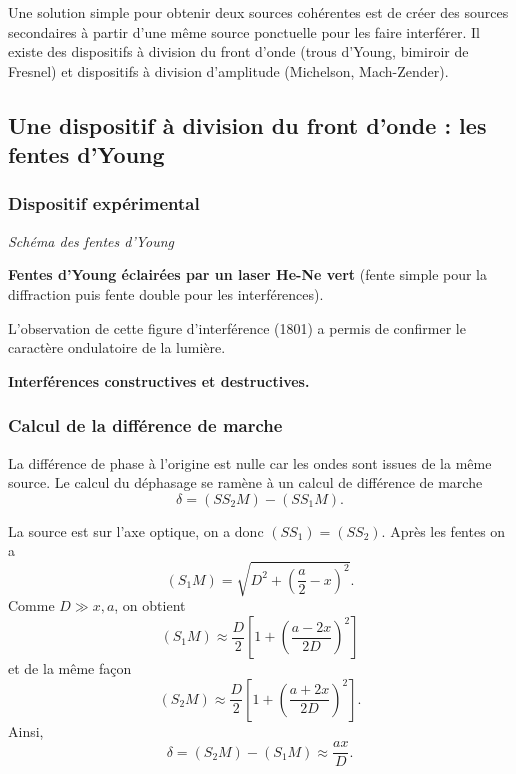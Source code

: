 \begin{transition}
Une solution simple pour obtenir deux sources cohérentes est de créer des sources secondaires à partir d'une même source ponctuelle pour les faire interférer. 
Il existe des dispositifs à division du front d'onde (trous d'Young, bimiroir de Fresnel) et dispositifs à division d'amplitude (Michelson, Mach-Zender).
\end{transition}

\subsection{Une dispositif à division du front d'onde : les fentes d'Young}

\subsubsection{Dispositif expérimental}

\emph{Schéma des fentes d'Young}

\begin{experience}
\textbf{Fentes d'Young éclairées par un laser He-Ne vert}
(fente simple pour la diffraction puis fente double pour les interférences).
\end{experience}

L'observation de cette figure d'interférence (1801) a permis de confirmer le caractère ondulatoire de la lumière.

\begin{slide}
\textbf{Interférences constructives et destructives.}
\end{slide}

\subsubsection{Calcul de la différence de marche}

La différence de phase à l'origine est nulle car les ondes sont issues de la même source.
Le calcul du déphasage se ramène à un calcul de différence de marche
\begin{equation}
\delta = (SS_2M)-(SS_1M).
\end{equation}

La source est sur l'axe optique, on a donc $(SS_1) = (SS_2)$.
Après les fentes on a 
\begin{equation}
(S_1M) = \sqrt{D^2 + \left(\frac{a}{2} - x\right)^2}.
\end{equation}
Comme $D \gg x, a$, on obtient
\begin{equation}
(S_1M)\approx\frac{D}{2}\left[1+\left(\frac{a-2x}{2D}\right)^2\right]
\end{equation}
et de la même façon
\begin{equation}
(S_2M) \approx \frac{D}{2}\left[1+\left(\frac{a+2x}{2D}\right)^2\right].
\end{equation}
Ainsi,
\begin{equation}
\delta = (S_2M) - (S_1M) \approx \frac{ax}{D}.
\end{equation}

